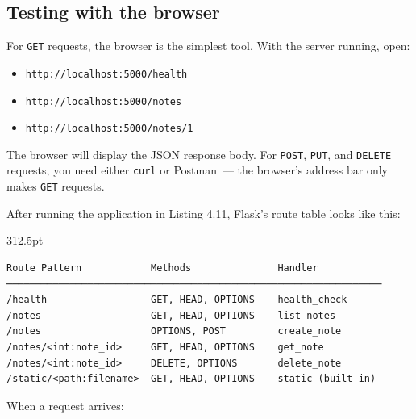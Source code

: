 \subsection*{Testing with the browser}\label{04-request-handling-paths:testing-with-the-browser}

For \texttt{GET} requests, the browser is the simplest tool. With the server running, open:

\begin{itemize}
\tightlist
\item
  \texttt{http:}\allowbreak{}\texttt{/}\allowbreak{}\texttt{/}\allowbreak{}\texttt{localhost:}\allowbreak{}\texttt{5000/}\allowbreak{}\texttt{health}
\item
  \texttt{http:}\allowbreak{}\texttt{/}\allowbreak{}\texttt{/}\allowbreak{}\texttt{localhost:}\allowbreak{}\texttt{5000/}\allowbreak{}\texttt{notes}
\item
  \texttt{http:}\allowbreak{}\texttt{/}\allowbreak{}\texttt{/}\allowbreak{}\texttt{localhost:}\allowbreak{}\texttt{5000/}\allowbreak{}\texttt{notes/}\allowbreak{}\texttt{1}
\end{itemize}

\noindent{}The browser will display the JSON response body. For \texttt{POST}, \texttt{PUT}, and \texttt{DELETE} requests, you need either \texttt{curl} or Postman~--- the browser's address bar only makes \texttt{GET} requests.

\label{04-request-handling-paths:the-route-table-after-listing-411}

After running the application in Listing 4.11, Flask's route table looks like this:

\begin{diagrambox}[short]{312.5pt}
\begin{Verbatim}[fontsize=\fontsize{9.0}{8.55}\selectfont]
Route Pattern            Methods               Handler
─────────────────────────────────────────────────────────────────
/health                  GET, HEAD, OPTIONS    health_check
/notes                   GET, HEAD, OPTIONS    list_notes
/notes                   OPTIONS, POST         create_note
/notes/<int:note_id>     GET, HEAD, OPTIONS    get_note
/notes/<int:note_id>     DELETE, OPTIONS       delete_note
/static/<path:filename>  GET, HEAD, OPTIONS    static (built-in)
\end{Verbatim}
\end{diagrambox}

\noindent{}When a request arrives:

